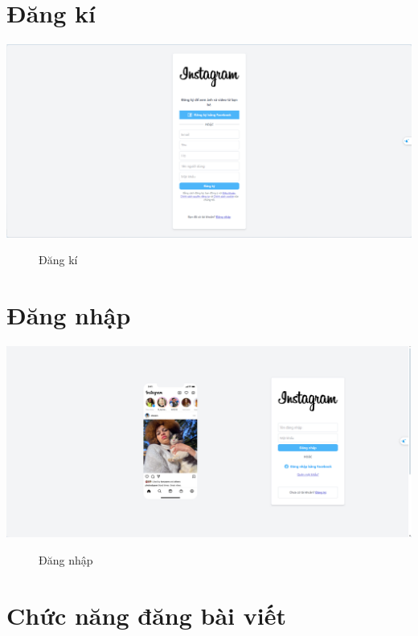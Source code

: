 \section{Đăng kí}


\includegraphics[width=1\textwidth]{img/instagram/dangki.png}
\begin{figure}[H]
    \centering
    \caption{Đăng kí}
\end{figure}


\FloatBarrier %

\section{Đăng nhập}
\includegraphics[width=1\textwidth]{img/instagram/dangnhap.png}
\begin{figure}[H]
    \centering
    \caption{Đăng nhập}
\end{figure}


\FloatBarrier %


\section{Chức năng đăng bài viết}

